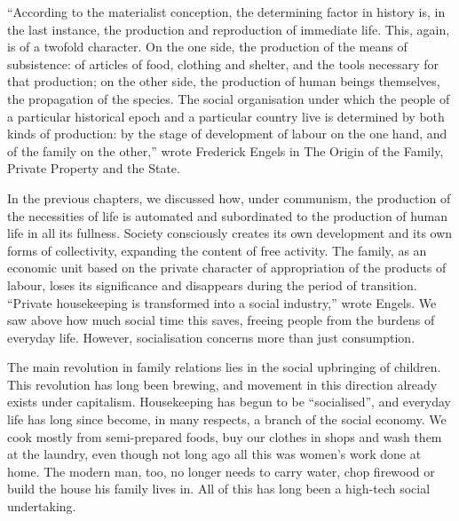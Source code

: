 \documentclass[12pt,a4paper,openany]{book}
\begin{document}
“According to the materialist conception, the determining factor in history is, in the last instance, the production and reproduction of immediate life. This, again, is of a twofold character. On the one side, the production of the means of subsistence: of articles of food, clothing and shelter, and the tools necessary for that production; on the other side, the production of human beings themselves, the propagation of the species. The social organisation under which the people of a particular historical epoch and a particular country live is determined by both kinds of production: by the stage of development of labour on the one hand, and of the family on the other,” wrote Frederick Engels in The Origin of the Family, Private Property and the State.

In the previous chapters, we discussed how, under communism, the production of the necessities of life is automated and subordinated to the production of human life in all its fullness. Society consciously creates its own development and its own forms of collectivity, expanding the content of free activity. The family, as an economic unit based on the private character of appropriation of the products of labour, loses its significance and disappears during the period of transition. “Private housekeeping is transformed into a social industry,” wrote Engels. We saw above how much social time this saves, freeing people from the burdens of everyday life. However, socialisation concerns more than just consumption.

The main revolution in family relations lies in the social upbringing of children. This revolution has long been brewing, and movement in this direction already exists under capitalism. Housekeeping has begun to be “socialised”, and everyday life has long since become, in many respects, a branch of the social economy. We cook mostly from semi-prepared foods, buy our clothes in shops and wash them at the laundry, even though not long ago all this was women’s work done at home. The modern man, too, no longer needs to carry water, chop firewood or build the house his family lives in. All of this has long been a high-tech social undertaking.
\end{document}
